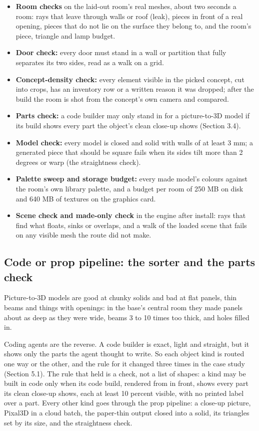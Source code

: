 \begin{itemize}
\tightlist
\item
  \textbf{Room checks} on the laid-out room's real meshes, about two seconds a room: rays that leave through walls or roof (leak), pieces in front of a real opening, pieces that do not lie on the surface they belong to, and the room's piece, triangle and lamp budget.
\item
  \textbf{Door check:} every door must stand in a wall or partition that fully separates its two sides, read as a walk on a grid.
\item
  \textbf{Concept-density check:} every element visible in the picked concept, cut into crops, has an inventory row or a written reason it was dropped; after the build the room is shot from the concept's own camera and compared.
\item
  \textbf{Parts check:} a code builder may only stand in for a picture-to-3D model if its build shows every part the object's clean close-up shows (Section 3.4).
\item
  \textbf{Model check:} every model is closed and solid with walls of at least 3 mm; a generated piece that should be square fails when its sides tilt more than 2 degrees or warp (the straightness check).
\item
  \textbf{Palette sweep and storage budget:} every made model's colours against the room's own library palette, and a budget per room of 250 MB on disk and 640 MB of textures on the graphics card.
\item
  \textbf{Scene check and made-only check} in the engine after install: rays that find what floats, sinks or overlaps, and a walk of the loaded scene that fails on any visible mesh the route did not make.
\end{itemize}

\subsection{Code or prop pipeline: the sorter and the parts check}\label{code-or-prop-pipeline-the-sorter-and-the-parts-check}

Picture-to-3D models are good at chunky solids and bad at flat panels, thin beams and things with openings: in the base's central room they made panels about as deep as they were wide, beams 3 to 10 times too thick, and holes filled in.

Coding agents are the reverse. A code builder is exact, light and straight, but it shows only the parts the agent thought to write. So each object kind is routed one way or the other, and the rule for it changed three times in the case study (Section 5.1). The rule that held is a check, not a list of shapes: a kind may be built in code only when its code build, rendered from in front, shows every part its clean close-up shows, each at least 10 percent visible, with no printed label over a part. Every other kind goes through the prop pipeline: a close-up picture, Pixal3D \citep{li2026pixal3d} in a cloud batch, the paper-thin output closed into a solid, its triangles set by its size, and the straightness check.

